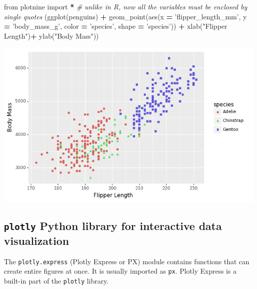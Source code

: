 \documentclass[]{book}
\newenvironment{Shaded}{\begin{snugshade}}{\end{snugshade}}
\newcommand{\CommentTok}[1]{\textcolor[rgb]{0.56,0.35,0.01}{\textit{#1}}}
\newcommand{\ImportTok}[1]{#1}
\newcommand{\NormalTok}[1]{#1}
\newcommand{\OperatorTok}[1]{\textcolor[rgb]{0.81,0.36,0.00}{\textbf{#1}}}
\newcommand{\StringTok}[1]{\textcolor[rgb]{0.31,0.60,0.02}{#1}}
\begin{document}
\begin{Shaded}
\begin{Highlighting}[]
\ImportTok{from}\NormalTok{ plotnine }\ImportTok{import} \OperatorTok{*}
\CommentTok{# unlike in R, now all the variables must be enclosed by single quotes}
\NormalTok{(ggplot(penguins) }\OperatorTok{+}
\NormalTok{  geom_point(aes(x }\OperatorTok{=} \StringTok{'flipper_length_mm'}\NormalTok{,}
\NormalTok{                  y }\OperatorTok{=} \StringTok{'body_mass_g'}\NormalTok{,}
\NormalTok{                  color }\OperatorTok{=} \StringTok{'species'}\NormalTok{,}
\NormalTok{                  shape }\OperatorTok{=} \StringTok{'species'}\NormalTok{)) }\OperatorTok{+}
\NormalTok{  xlab(}\StringTok{"Flipper Length"}\NormalTok{)}\OperatorTok{+}
\NormalTok{  ylab(}\StringTok{"Body Mass"}\NormalTok{))}
\end{Highlighting}
\end{Shaded}

\begin{center}\includegraphics[width=0.9\linewidth]{fig/Viz_chap/3_plotnine} \end{center}

\hypertarget{plotly-python-library-for-interactive-data-visualization}{%
\subsection{\texorpdfstring{\texttt{plotly} Python library for interactive data visualization}{plotly Python library for interactive data visualization}}\label{plotly-python-library-for-interactive-data-visualization}}

The \texttt{plotly.express} (Plotly Express or PX) module contains functions that can create entire figures at once. It is usually imported as \texttt{px}. Plotly Express is a built-in part of the \texttt{plotly} library.
\end{document}
